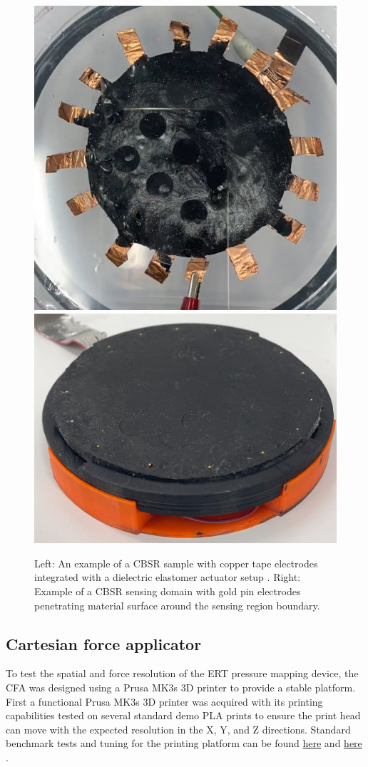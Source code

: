 \begin{figure}[H]
	\centering
	\includegraphics[width=0.3\linewidth]{Figures/DEA-EIT-sample_0.5mm_100mm.png}
	\hspace{2cm}
	\includegraphics[width=0.4\linewidth]{Figures/CBSR_DUT_w_electrodes_sample.jpg}
	\caption{Left: An example of a CBSR sample with copper tape electrodes integrated with a dielectric elastomer actuator setup \cite{Ellingham2024a}. Right: Example of a CBSR sensing domain with gold pin electrodes penetrating material surface around the sensing region boundary.}
	\label{fig:CBSR_samples_examples}
\end{figure}


\subsection{Cartesian force applicator}
To test the spatial and force resolution of the ERT pressure mapping device, the CFA was designed using a Prusa MK3s 3D printer to provide a stable platform. First a functional Prusa MK3s 3D printer was acquired with its printing capabilities tested on several standard demo PLA prints to ensure the print head can move with the expected resolution in the X, Y, and Z directions. Standard benchmark tests and tuning for the printing platform can be found  \href{https://blog.prusa3d.com/does-your-freshly-assembled-original-prusa-i3-mk3-print-as-the-best-it-can_29445/}{here} and \href{https://help.prusa3d.com/category/print-quality-troubleshooting_225}{here} \cite{Stritesky2019, Prusa2024}.

